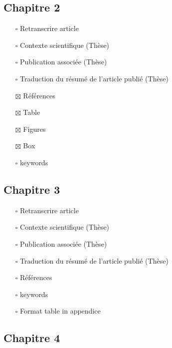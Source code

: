 \hypertarget{chapitre-2}{%
\subsection{Chapitre 2}\label{chapitre-2}}

\begin{itemize}
\tightlist
\item[$\square$]
  Retranscrire article
\item[$\square$]
  Contexte scientifique (Thèse)
\item[$\square$]
  Publication associée (Thèse)
\item[$\square$]
  Traduction du résumé de l'article publié (Thèse)
\item[$\boxtimes$]
  Références
\item[$\boxtimes$]
  Table
\item[$\boxtimes$]
  Figures
\item[$\boxtimes$]
  Box
\item[$\square$]
  keywords
\end{itemize}

\hypertarget{chapitre-3}{%
\subsection{Chapitre 3}\label{chapitre-3}}

\begin{itemize}
\tightlist
\item[$\square$]
  Retranscrire article
\item[$\square$]
  Contexte scientifique (Thèse)
\item[$\square$]
  Publication associée (Thèse)
\item[$\square$]
  Traduction du résumé de l'article publié (Thèse)
\item[$\square$]
  Références
\item[$\square$]
  keywords
\item[$\square$]
  Format table in appendice
\end{itemize}

\hypertarget{chapitre-4}{%
\subsection{Chapitre 4}\label{chapitre-4}}

